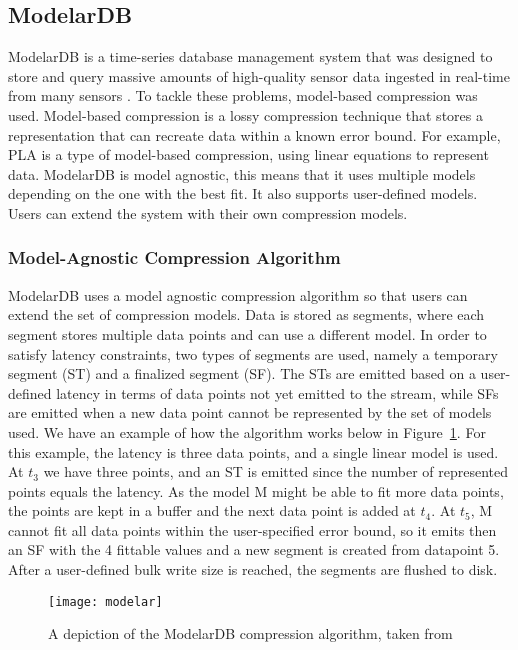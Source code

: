 \subsection{ModelarDB}
ModelarDB is a time-series database management system that was designed to store and query
massive amounts of high-quality sensor data ingested in real-time from many sensors
\cite{jensen_2018_modelardb}.
To tackle these problems, model-based compression was used. Model-based compression is a
lossy compression technique that stores a representation that can recreate data within a
known error bound. For example, PLA is a type of model-based compression, using linear
equations to represent data. ModelarDB is model agnostic, this means that it uses multiple
models depending on the one with the best fit. It also supports user-defined models.
Users can extend the system with their own compression models.

\subsubsection{Model-Agnostic Compression Algorithm}
ModelarDB uses a model agnostic compression algorithm so that users can extend the set of
compression models. Data is stored as segments, where each segment stores multiple data
points and can use a different model. In order to satisfy latency constraints, two types
of segments are used, namely a temporary segment (ST) and a finalized segment (SF).
The STs are emitted based on a user-defined latency in terms of data points not yet
emitted to the stream, while SFs are emitted when a new data point cannot be represented
by the set of models used.
We have an example of how the algorithm works below in Figure~\ref{modelar}. For this example,
the latency is three data points, and a single linear model is used. At $t_3$  we have three
points, and an ST is emitted since the number of represented points equals the latency.
As the model M might be able to fit more data points, the points are kept in a buffer and
the next data point is added at $t_4$. At $t_5$, M cannot fit all data points within the
user-specified error bound, so it emits then an SF with the 4 fittable values and a
new segment is created from datapoint 5. After a user-defined bulk write size is
reached,  the segments are flushed to disk.

\begin{figure}
\begin{center}
\texttt{[image: modelar]}
\caption[modelar]{A depiction of the ModelarDB compression algorithm, taken from \cite{jensen_2018_modelardb}}
\label{modelar}
\end{center}
\end{figure}


